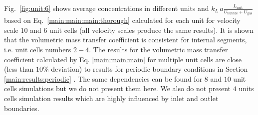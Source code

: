 \documentclass{article}
\newcommand{\beq}{\begin{equation}}
\newcommand{\feq}{\end{equation}}
\newcommand{\beqal}{\begin{equation}\begin{aligned}}
\newcommand{\feqal}{\end{aligned}\end{equation}}
\newcommand{\vol}{k_L\,a}
\newcommand{\lunit}{L_{\mathrm{unit}}}
\newcommand{\ububble}{U_{\mathrm{bubble}}}
\newcommand{\uliq}{U_{\mathrm{liq}}}
\newcommand{\ugas}{U_{\mathrm{gas}}}
\newcommand{\cstar}{C^{*}}
\newcommand{\volnondim}{\vol \frac{\lunit}{\ububble+\ugas}}
\begin{document}
Fig.~\ref{fig:unit:6} shows average concentrations in different units and $\volnondim$ based on
Eq.~\ref{main:main:main:thorough} calculated for each unit for velocity
scale $10$ and  $6$ unit cells (all velocity scales produce the same results). It is shown that the
volumetric mass transfer coefficient is consistent for internal segments, i.e.
unit cells numbers $2-4$.  The results for the volumetric mass transfer
coefficient calculated by Eq. \ref{main:main:main} for multiple unit cells are
close (less than $10\%$ deviation) to results for periodic boundary conditions in Section
\ref{main:results:periodic} . 
The same dependencies
can be found for
$8$ and $10$ unit cells simulations but we do not present them here. We also do not present $4$
units cells simulation results which are highly influenced by inlet and outlet boundaries.
\end{document}
